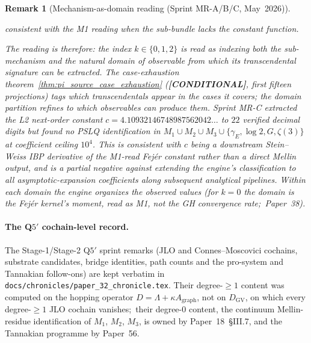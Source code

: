 \documentclass[11pt]{article}
\newtheorem{remark}{Remark}
\begin{document}
\begin{remark}[Mechanism-as-domain reading (Sprint MR-A/B/C, May~2026)]
\begin{itemize}
consistent with the M1 reading when the sub-bundle lacks the constant
function.
\end{itemize}
The reading is therefore: the index $k \in \{0, 1, 2\}$ is read as
indexing \emph{both} the sub-mechanism and the natural domain of observable
from which its transcendental signature can be extracted. The
case-exhaustion theorem~\ref{thm:pi_source_case_exhaustion}
(\textbf{[CONDITIONAL]}, first fifteen projections) tags \emph{which}
transcendentals appear in the cases it covers; the domain partition
refines to \emph{which observables} can produce them. Sprint MR-C
extracted the L2 next-order constant $c = 4.10932146748987562042\ldots$
to $22$ verified decimal digits but
found no PSLQ identification in $M_1 \cup M_2 \cup M_3 \cup \{\gamma_E, \log 2,
G, \zeta(3)\}$ at coefficient ceiling $10^4$. This is consistent
with $c$ being a downstream Stein--Weiss IBP derivative of the
M1-read Fej\'er constant rather than a direct Mellin output, and is a partial
negative against extending the engine's classification to all
asymptotic-expansion coefficients along subsequent analytical
pipelines. Within each domain the engine organizes the observed
values (for $k = 0$ the domain is the Fej\'er kernel's moment, read
as M1, not the GH convergence rate;\ Paper~38).

\end{remark}

\paragraph{The Q$5'$ cochain-level record.}  The Stage-1/Stage-2 Q$5'$
sprint remarks (JLO and Connes--Moscovici cochains, substrate
candidates, bridge identities, path counts and the pro-system and
Tannakian follow-ons) are kept verbatim in
\texttt{docs/chronicles/paper\_32\_chronicle.tex}.  Their degree-$\ge 1$
content was computed on the hopping operator $D = \Lambda + \kappa
A_{\mathrm{graph}}$, not on $D_{\mathrm{GV}}$, on which every degree-$\ge 1$
JLO cochain vanishes;\ their degree-$0$ content, the continuum
Mellin-residue identification of $M_1$, $M_2$, $M_3$, is owned by
Paper~18~\S III.7, and the Tannakian programme by Paper~56.
\end{document}
